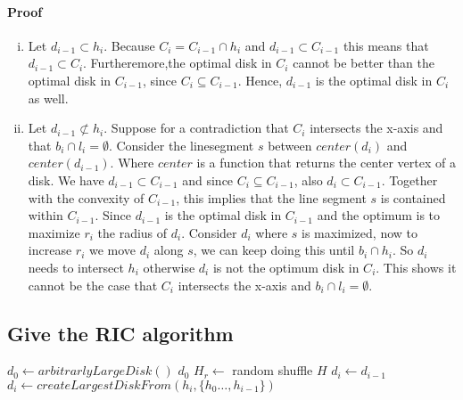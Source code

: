 \documentclass{article}
\begin{document}
\paragraph{Proof}
\begin{enumerate}[(i)]
	\item Let $d_{i-1} \subset h_i$. Because $C_i = C_{i-1}\cap h_i$ and
		$d_{i-1} \subset C_{i-1}$ this means that $d_{i-1} \subset C_i$.
		Furtheremore,the optimal disk in $C_i$
		cannot be better than the optimal disk in $C_{i-1}$, since
		$C_i \subseteq C_{i-1}$. Hence, $d_{i-1}$ is the optimal disk
		in $C_i$ as well.
	\item Let $d_{i-1} \not\subset h_{i}$. Suppose for a contradiction that
		$C_i$ intersects the x-axis and that $b_i \cap l_i = \emptyset$.
		Consider the linesegment $s$ between $center(d_i)$ and 
		$center(d_{i-1})$.
		Where $center$ is a function that returns the center vertex of a disk.
		We have $d_{i-1} \subset C_{i-1}$ and
		since $C_i \subseteq C_{i-1}$, also $d_i \subset C_{i-1}$.
		Together with the convexity of $C_{i-1}$, this implies that
		the line segment $s$ is contained within $C_{i-1}$.
		Since $d_{i-1}$ is the optimal disk in $C_{i-1}$ and the optimum is to
		maximize $r_i$ the radius of $d_i$. Consider $d_i$
		where $s$ is maximized, now to increase $r_i$ we move $d_i$ along $s$,
		we can keep doing this until $b_i \cap h_i$.
		So $d_i$ needs to intersect $h_i$ otherwise $d_i$ is not the optimum
		disk in $C_i$. This shows it cannot be the case that $C_i$ intersects
		the x-axis and $b_i\cap l_i = \emptyset$.

\end{enumerate}
\subsection{Give the RIC algorithm}

\begin{algorithmic}[1]
		\State
		$d_0 \gets arbitrarlyLargeDisk()$
			\State
			\Return $d_0$
		\EndIf
		\State
		$H_r \gets$ random shuffle $H$
			\State
			$d_i \gets d_{i-1}$
			\State
			$d_i \gets createLargestDiskFrom(h_i, \{h_0\dots,h_{i-1}\})$
			\EndIf
		\EndFor
	\EndFunction
\end{algorithmic}
\end{document}
